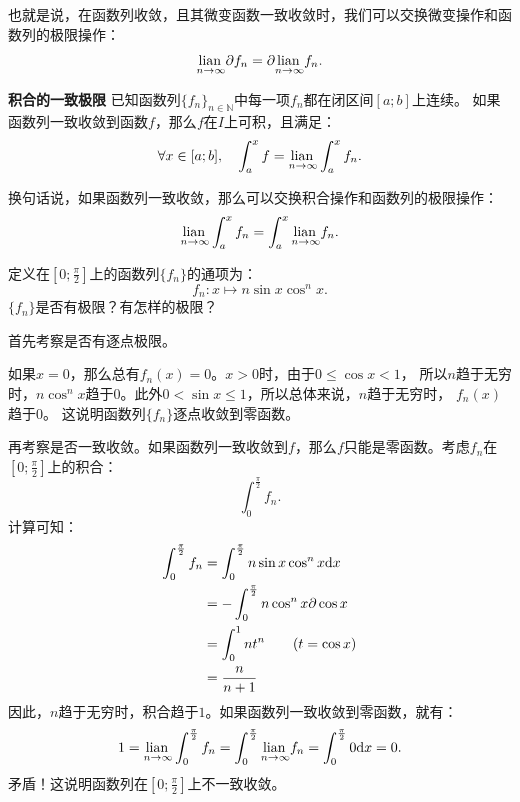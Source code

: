 \documentclass[12pt,UTF8]{ctexbook}
\begin{document}
也就是说，在函数列收敛，且其微变函数一致收敛时，我们可以交换微变操作和函数列的极限操作：
$$ \underset{n\to \infty}{\operatorname{lian}\,} \partial f_n = \partial \underset{n\to \infty}{\operatorname{lian}\,} f_n. $$

\begin{tm}{\textbf{积合的一致极限}}\label{tm:2-1-30}
    已知函数列$\{f_n\}_{n\in\mathbb{N}}$中每一项$f_n$都在闭区间$[a;b]$上连续。
    如果函数列一致收敛到函数$f$，那么$f$在$I$上可积，且满足：
    $$ \forall x \in [a; b],\quad \int_{a}^x f = \underset{n\to \infty}{\operatorname{lian}\,} \int_{a}^x f_n. $$
\end{tm}

换句话说，如果函数列一致收敛，那么可以交换积合操作和函数列的极限操作：
$$ \underset{n\to \infty}{\operatorname{lian}\,} \int_{a}^x f_n = \int_{a}^x \underset{n\to \infty}{\operatorname{lian}\,} f_n. $$

\begin{et}
    定义在$\left[0;\frac{\pi}{2}\right]$上的函数列$\{f_n\}$的通项为：
    $$ f_n: x\mapsto n\sin{x}\cos^n{x}. $$
    $\{f_n\}$是否有极限？有怎样的极限？
\end{et}

\begin{so}
    首先考察是否有逐点极限。

    如果$x = 0$，那么总有$f_n(x) = 0$。$x > 0$时，由于$0\leqslant\cos{x}<1$，
    所以$n$趋于无穷时，$n\cos^n{x}$趋于$0$。此外$0 < \sin{x} \leqslant 1$，所以总体来说，$n$趋于无穷时，
    $f_n(x)$趋于$0$。
    这说明函数列$\{f_n\}$逐点收敛到零函数。

    再考察是否一致收敛。如果函数列一致收敛到$f$，那么$f$只能是零函数。考虑$f_n$在$\left[0;\frac{\pi}{2}\right]$上的积合：
    $$ \int_{0}^{\frac{\pi}{2}} f_n.$$
    计算可知：
    \begin{align*}
        \int_{0}^{\frac{\pi}{2}} f_n &= \int_{0}^{\frac{\pi}{2}} n\sin{x}\cos^n{x} \mathrm{d}x \\
        &= -\int_{0}^{\frac{\pi}{2}} n\cos^n{x} \partial \cos{x} \\
        &= \int_{0}^{1} n t^n \tag{$t = \cos{x}$} \\
        &= \frac{n}{n + 1}
    \end{align*}
    因此，$n$趋于无穷时，积合趋于$1$。如果函数列一致收敛到零函数，就有：
    $$ 1 = \underset{n\to\infty}{\operatorname{lian}\,} \int_{0}^{\frac{\pi}{2}} f_n = \int_{0}^{\frac{\pi}{2}} \underset{n\to\infty}{\operatorname{lian}\,} f_n = \int_{0}^{\frac{\pi}{2}} 0\mathrm{d}x = 0.$$
    矛盾！这说明函数列在$\left[0;\frac{\pi}{2}\right]$上不一致收敛。
\end{so}
\end{document}
